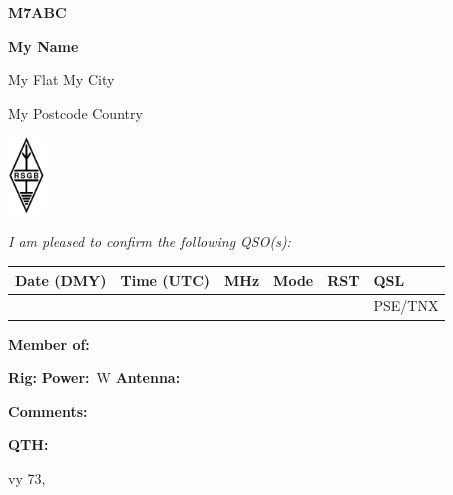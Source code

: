 \documentclass{article}
\renewcommand{\quad}{\hspace*{2.5ex}}
\begin{document}
\begin{minipage}{3.5cm}
{\Huge \textbf{M7ABC}} %

\smallskip

\textbf{My Name}

\smallskip

\footnotesize
My Flat
My City

My Postcode Country

\end{minipage}
\begin{minipage}{1.3cm}
\centering \includegraphics[width=1cm]{rsgb_logo_2016mono.png}
\end{minipage}
\hfill
\begin{minipage}{5.5cm} %

\smallskip

\end{minipage}

\bigskip

\textit{\small{I am pleased to confirm the following QSO(s):}}
\begin{center}
\begin{tabular}{|P{2.5cm}|P{2cm}|P{1.3cm}|P{1.3cm}|P{1.3cm}|P{1.5cm}|}
\hline
\vphantom{$\dfrac a b$} \bf Date (DMY) & \bf Time (UTC) & \bf MHz & \bf Mode & \bf RST  & \bf QSL \\
\hline
\hline
\vphantom{$\dfrac b b$} & & & & & PSE/TNX\\
\hline
\end{tabular}

\smallskip

\footnotesize\textbf{Member of:}
\end{center}

\bigskip

\textbf{Rig:} \makebox[2cm]{\hrulefill} \quad \textbf{Power:} \makebox[1cm]{\hrulefill}\,W \quad \textbf{Antenna:} \makebox[2cm]{\hrulefill}

\bigskip

\textbf{Comments:}

\bigskip

\textbf{QTH:}

\null\hfill vy 73, \makebox[3.5cm]{\dotfill}
\end{document}
